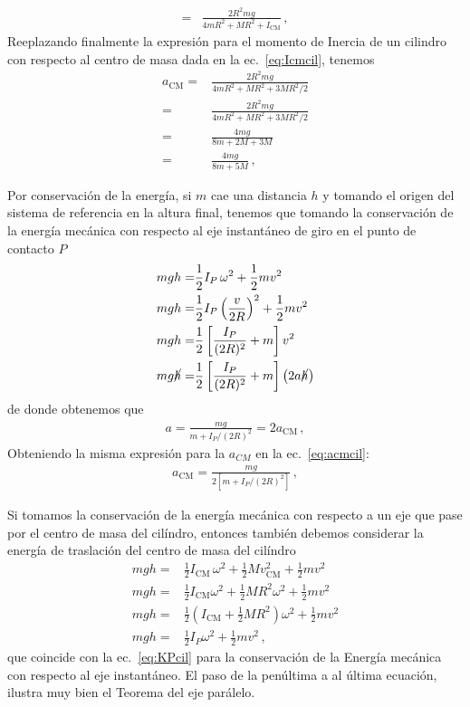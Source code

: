 \begin{itemize}
\begin{align*}
  =&  \frac{2R^2mg}{4 m R^2+MR^2+I_{\text{CM}}}\,,
\end{align*}
Reeplazando finalmente la expresión para el momento de Inercia de un cilindro con respecto al centro de masa dada en la ec.~\eqref{eq:Icmcil}, tenemos
\begin{align*}
  a_{\text{CM}}=&\frac{2R^2mg}{4 m R^2+MR^2+3MR^2/2}\nonumber\\
=&\frac{2R^2mg}{4 m R^2+MR^2+3MR^2/2}\nonumber\\
=&\frac{4mg}{8 m +2M+3M}\nonumber\\
=&\frac{4mg}{8 m +5M}\,,
\end{align*}




Por conservación de la energía, si $m$ cae una distancia $h$ y tomando el origen del sistema de referencia en la altura final, tenemos que tomando la conservación de la energía mecánica con respecto al eje instantáneo de giro en el punto de contacto $P$
\begin{align}
  \label{eq:KPcil}
  mgh=&\frac{1}{2}I_P\,\omega^2+\frac{1}{2}mv^2 \\
  mgh=&\frac{1}{2}I_P\left( \frac{v}{2R} \right)^2+\frac{1}{2}mv^2 \nonumber\\
  mgh=&\frac{1}{2}\left[\frac{I_P}{(2R)^2}+m\right]v^2\nonumber\\
  mg\cancel{h}=&\frac{1}{2}\left[\frac{I_P}{(2R)^2}+m\right]\left(2 a \cancel{h}  \right)\nonumber
\end{align}
de donde obtenemos que
\begin{align*}
a=\frac{mg}{m+I_P/(2R)^2}=2a_{\text{CM}}\,,
\end{align*}
Obteniendo la misma expresión para la $a_{CM}$ en la ec.~\eqref{eq:acmcil}:
\begin{align*}
a_{\text{CM}}=  \frac{mg}{2 \left[ m+I_P/(2R)^2 \right]}\,,
\end{align*}

Si tomamos la conservación de la energía mecánica con respecto a un
eje que pase por el centro de masa del cilíndro, entonces también
debemos considerar la energía de traslación del centro de masa del
cilíndro
\begin{align*}
   mgh=&\frac{1}{2}I_{\text{CM}}\,\omega^2+\frac{1}{2}Mv_{\text{CM}}^2+\frac{1}{2}mv^2 \nonumber\\
   mgh=&\frac{1}{2}I_{\text{CM}}\omega^2+\frac{1}{2}MR^2\omega^2+\frac{1}{2}mv^2 \nonumber\\
   mgh=&\frac{1}{2}\left( I_{\text{CM}}+\frac{1}{2}MR^2 \right)\omega^2+\frac{1}{2}mv^2 \nonumber\\
   mgh=&\frac{1}{2}I_P\omega^2+\frac{1}{2}mv^2\,,
\end{align*}
que coincide con la ec.~\eqref{eq:KPcil} para la conservación de la Energía mecánica con respecto al eje instantáneo. El paso de la penúltima a al última ecuación, ilustra muy bien el Teorema del eje parálelo. 
\end{itemize}


